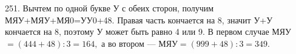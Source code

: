 251. Вычтем по одной букве У с обеих сторон, получим МЯУ+МЯУ+МЯ0=УУ0+48. Правая часть кончается на 8, значит У+У кончается на 8, поэтому У может быть равно 4 или 9. В первом случае МЯУ$=(444+48):3=164,$ а во втором --- МЯУ$=(999+48):3=349.$\\

